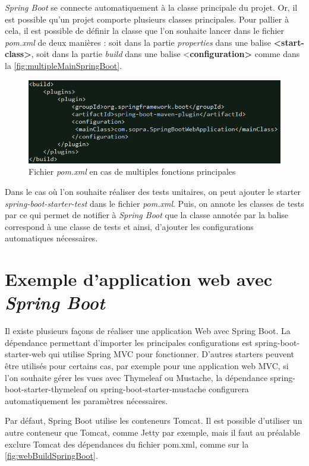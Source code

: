 \documentclass{polytech/polytech}
\begin{document}
\textit{Spring Boot} se connecte automatiquement à la classe principale du projet. Or, il est possible qu’un projet comporte plusieurs classes principales. Pour pallier à cela, il est possible de définir la classe que l’on souhaite lancer dans le fichier \textit{pom.xml} de deux manières : soit dans la partie \textit{properties} dans une balise \textbf{<start-class>}, soit dans la partie \textit{build} dans une balise <\textbf{configuration>} comme dans la  \autoref{fig:multipleMainSpringBoot}.

\begin{figure}
	\includegraphics[scale=0.8]{images/multipleMain}
	\caption{Fichier \textit{pom.xml} en cas de multiples fonctions principales}
	\label{fig:multipleMainSpringBoot}
\end{figure}

Dans le cas où l'on souhaite réaliser des tests unitaires, on peut ajouter le starter \textit{spring-boot-starter-test} dans le fichier \textit{pom.xml}. Puis, on annote les classes de tests par  ce qui permet de notifier à \textit{Spring Boot} que la classe annotée par la balise correspond à une classe de tests et ainsi, d'ajouter les configurations automatiques nécessaires.

\section{Exemple d'application web avec \textit{Spring Boot}}

Il existe plusieurs façons de réaliser une application Web avec Spring Boot. La dépendance permettant d’importer les principales configurations est spring-boot-starter-web qui utilise Spring MVC pour fonctionner. D’autres starters peuvent être utilisés pour certains cas, par exemple pour une application web MVC, si l’on souhaite gérer les vues avec Thymeleaf ou Mustache, la dépendance spring-boot-starter-thymeleaf ou spring-boot-starter-mustache configurera automatiquement les paramètres nécessaires. 

Par défaut, Spring Boot utilise les conteneurs Tomcat. Il est possible d’utiliser un autre conteneur que Tomcat, comme Jetty par exemple, mais il faut au préalable exclure Tomcat des dépendances du fichier pom.xml, comme sur la \autoref{fig:webBuildSpringBoot}.
\end{document}
